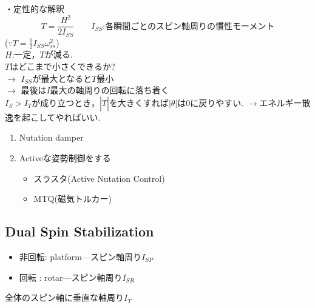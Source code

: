 \documentclass[class=article, crop=false, dvipdfmx]{standalone}
\begin{document}
\begin{center}

\end{center}


\noindent
・定性的な解釈\\
\[ T=\frac{H^2}{2I_{SS}} \qquad I_{SS}\text{:各瞬間ごとのスピン軸周りの慣性モーメント} \]
($\because T=\frac{1}{2}I_{SS}\omega_{ss}^2$)\\
$H$:一定，$T$が減る.\\
\qquad $T$はどこまで小さくできるか?\\
$\rightarrow$ $I_{SS}$が最大となると$T$最小\\
$\rightarrow$ 最後は$I$最大の軸周りの回転に落ち着く\\
$I_S>I_T$が成り立つとき，$|\dot{T}|$を大きくすれば$|\theta|$は0に戻りやすい.
$\rightarrow$エネルギー散逸を起こしてやればいい.
\begin{enumerate}
\item Nutation damper
\begin{center}

\end{center}

\item Activeな姿勢制御をする
\begin{itemize}
\item スラスタ(Active Nutation Control)
\item MTQ(磁気トルカー)
\end{itemize}
\end{enumerate}



\subsection{Dual Spin Stabilization}
\begin{itemize}
\item 非回転: platform---スピン軸周り$I_{SP}$
\item 回転 : rotar---スピン軸周り$I_{SR}$
\end{itemize}

全体のスピン軸に垂直な軸周り$I_T$
\end{document}

